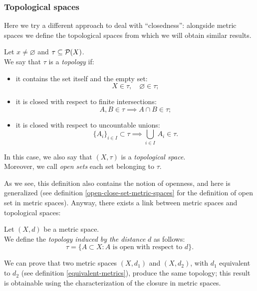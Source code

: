 \subsubsection{Topological spaces}

Here we try a different approach to deal with ``closedness'': alongside metric spaces we define the topological spaces from which we will obtain similar results.

\begin{defn} \label{topological-spaces}
  Let $x \neq \varnothing$ and $\tau \subseteq \mathcal P(X)$.\\
  We say that $\tau$ is a \emph{topology} if:
  \begin{itemize}
    \item it contains the set itself and the empty set: 			
    $$
    	X \in \tau,
    	\quad \varnothing \in \tau
    ;
    $$
    \item it is closed with respect to finite intersections: 	
    $$
    	A, B \in \tau 
    	\implies A \cap B \in \tau
    ;
    $$
    \item it is closed with respect to uncountable unions: 		
    $$
    	\{ A_i \}_{i \in I} \subset \tau 
    	\implies \bigcup_{i \in I} \, A_i \in \tau
    .
    $$
  \end{itemize}
  In this case, we also say that $(X, \tau)$ is a \emph{topological space}.\\
  Moreover, we call \emph{open sets} each set belonging to $\tau$.
\end{defn}

As we see, this definition also contains the notion of openness, and here is generalized (see definition \vref{open-close-set-metric-spaces} for the definition of open set in metric spaces). Anyway, there exists a link between metric spaces and topological spaces:
\begin{defn}\label{rem-metric-spaces-topology}
	Let $(X,d)$ be a metric space.\\
	We define the \emph{topology induced by the distance} $d$ as follows:
	$$
	\tau
	= \{ A \subset X : A \text{ is open with respect to } d\}
	.
	$$
\end{defn}

We can prove that two metric spaces $(X, d_1)$ and $\left(X, d_2\right)$, with $d_1$ equivalent to $d_2$ (see definition \vref{equivalent-metrics}), produce the same topology; this result is obtainable using the characterization of the closure in metric spaces.


